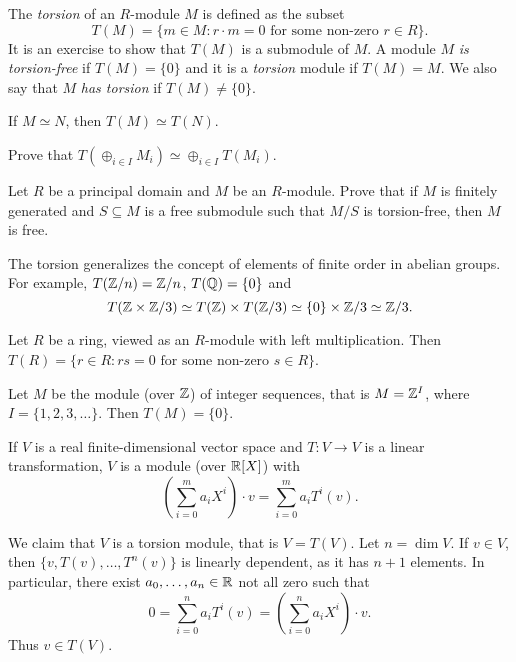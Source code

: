 The \emph{torsion} of an $R$-module $M$ 
is defined as the subset 
\[
T(M)=\{m\in M:r\cdot m=0\text{ for some non-zero $r\in R$}\}.
\]
It is an exercise to show that $T(M)$ is a submodule of $M$. 
A module $M$ 
\emph{is torsion-free} if $T(M)=\{0\}$ and it is 
a \emph{torsion} module if $T(M)=M$.  We also say that $M$ \emph{has torsion}
if $T(M)\ne\{0\}$. 

\begin{exercise}
If $M\simeq N$, then $T(M)\simeq T(N)$.
\end{exercise}

\begin{exercise}
Prove that $T(\oplus_{i\in I}M_i)\simeq \oplus_{i\in I}T(M_i)$.
\end{exercise}

\begin{exercise}
\label{xca:free}
    Let $R$ be a principal domain and $M$ be an $R$-module. Prove that
    if $M$ is finitely generated and $S\subseteq M$ is a free submodule such that
    $M/S$ is torsion-free, then $M$ is free.
\end{exercise}

The torsion generalizes the concept of elements of finite order in abelian groups. For example, 
 $T(\mathbb{Z}/n)=\mathbb{Z}/n$, $T(\mathbb{Q})=\{0\}$ and
 \[
 T(\mathbb{Z}\times\mathbb{Z}/3)\simeq T(\mathbb{Z})\times T(\mathbb{Z}/3)\simeq \{0\}\times\mathbb{Z}/3\simeq\mathbb{Z}/3.
 \]

\begin{example}
    Let $R$ be a ring, viewed as an $R$-module with left multiplication. 
    Then $T(R)=\{r\in R:rs=0\text{ for some non-zero $s\in R$}\}$.
\end{example}

\begin{example}
    Let $M$ be the module (over $\mathbb{Z}$) of
    integer sequences, that is $M=\mathbb{Z}^I$, where 
    $I=\{1,2,3,\dots\}$. Then $T(M)=\{0\}$. 
\end{example}

\begin{example}
If $V$ is a real finite-dimensional vector space and $T\colon V\to V$ 
is a linear transformation, $V$ is a module (over $\mathbb{R}[X]$) 
with 
\[
\left(\sum_{i=0}^m a_iX^i\right)\cdot v=\sum_{i=0}^m a_iT^i(v).
\]

We claim that 
$V$ is a torsion module, that is $V=T(V)$. Let $n=\dim V$. If $v\in V$, 
then $\{v,T(v),\dots,T^n(v)\}$ is linearly dependent, as it has 
$n+1$ elements. In particular, there exist $a_0,\dots,a_n\in\mathbb{R}$ not all zero such that
\[
0=\sum_{i=0}^n a_iT^i(v)=\left(\sum_{i=0}^n a_iX^i\right)\cdot v.
\]
Thus $v\in T(V)$. 
\end{example}

